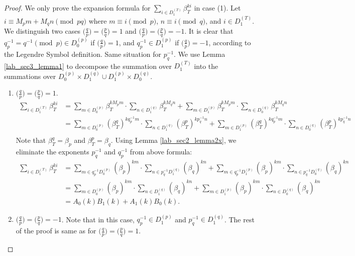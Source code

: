 \documentclass{mcom-l}
\theoremstyle{definition}
\numberwithin{equation}{section}
\begin{document}
            \begin{proof}
            We only prove the expansion formula for $ \sum_{i\in D_{1}^{(T)}}\beta_{T}^{ki} $ in case (1).  Let $ i\equiv M_{p}m+ M_{q}n \pmod{pq}$ where $ m\equiv i\pmod p $, $ n\equiv i\pmod q $, and $ i\in D_{1}^{(T)} $. We distinguish two cases $\bigl(\tfrac{q}{p}\bigr)=\bigl(\tfrac{p}{q}\bigr)=1  $ and $\bigl(\tfrac{q}{p}\bigr)=\bigl(\tfrac{p}{q}\bigr)=-1  $. It is clear that $ q_{p}^{-1}=q^{-1} \pmod p \in D_{0}^{(p)} $ if $\bigl(\tfrac{q}{p}\bigr)=1$, and $ q_{p}^{-1} \in D_{1}^{(p)} $ if $\bigl(\tfrac{q}{p}\bigr)=-1$, according to the Legendre Symbol definition. Same situation for $ p_{q}^{-1} $. We use Lemma \ref{lab_sec3_lemma1} to decompose the summation over $ D_{1}^{(T)} $ into the summations over $ D_{0}^{(p)}\times D_{1}^{(q)}\cup D_{1}^{(p)}\times D_{0}^{(q)} $.
            \begin{enumerate}
            \item $\bigl(\tfrac{q}{p}\bigr)=\bigl(\tfrac{p}{q}\bigr)=1  $.
            \begin{equation*}
            \begin{split}
             \sum_{i\in D_{1}^{(T)}}\beta_{T}^{ki}&=\sum_{m\in D_{0}^{(p)} }\beta_{T}^{kM_{p}m}\cdot\sum_{n\in D_{1}^{(q)} }\beta_{T}^{kM_{q}n}+
             \sum_{m\in D_{1}^{(p)} }\beta_{T}^{kM_{p}m}\cdot\sum_{n\in D_{0}^{(q)} }\beta_{T}^{kM_{q}n}\\
             &=\sum_{m\in D_{0}^{(p)} }(\beta_{T}^{q})^{k q_{p}^{-1}m}\cdot\sum_{n\in D_{1}^{(q)} }(\beta_{T}^{p})^{kp_{q}^{-1}n}+
             \sum_{m\in D_{1}^{(p)} }(\beta_{T}^{q})^{k q_{p}^{-1}m}\cdot\sum_{n\in D_{0}^{(q)} }(\beta_{T}^{p})^{kp_{q}^{-1}n}\\
            \end{split}
            \end{equation*}
            Note that $ \beta_{T}^{q}= \beta_{p} $ and $ \beta_{T}^{p}= \beta_{q} $. Using Lemma \ref{lab_sec2_lemma2x}, we eliminate the exponents $ p_{q}^{-1} $ and $ q_{p}^{-1} $ from  above formula:
            \begin{equation*}
            \begin{split}
            \sum_{i\in D_{1}^{(T)}}\beta_{T}^{ki}&=\sum_{m\in q_{p}^{-1}D_{0}^{(p)} }(\beta_{p})^{km}\cdot\sum_{n\in p_{q}^{-1}D_{1}^{(q)} }(\beta_{q})^{kn}+
              \sum_{m\in q_{p}^{-1}D_{1}^{(p)} }(\beta_{p})^{km}\cdot\sum_{n\in p_{q}^{-1}D_{0}^{(q)} }(\beta_{q})^{kn}\\
            &=\sum_{m\in D_{0}^{(p)} }(\beta_{p})^{km}\cdot\sum_{n\in D_{1}^{(q)} }(\beta_{q})^{kn}+
              \sum_{m\in D_{1}^{(p)} }(\beta_{p})^{km}\cdot\sum_{n\in D_{0}^{(q)} }(\beta_{q})^{kn}\\
              &=A_{0}(k)B_{1}(k)+A_{1}(k)B_{0}(k).
            \end{split}
            \end{equation*} 
            \item  $\bigl(\tfrac{q}{p}\bigr)=\bigl(\tfrac{p}{q}\bigr)=-1  $. Note that in this case, $ q_{p}^{-1} \in D_{1}^{(p)} $  and  $ p_{q}^{-1} \in D_{1}^{(q)} $. The rest of the proof is same as for $\bigl(\tfrac{q}{p}\bigr)=\bigl(\tfrac{p}{q}\bigr)=1  $.
            

\end{enumerate}
\end{proof}
\end{document}
